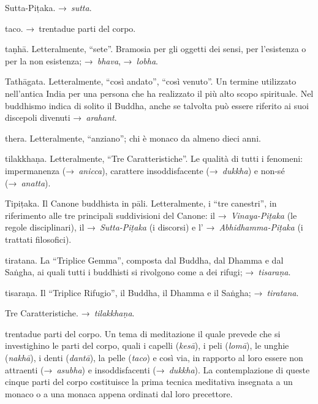 \begin{glossarydescription}
\item[Sutta-Piṭaka.] →~\emph{sutta}.


\item[taco.] →~trentadue parti del corpo.

\item[taṇhā.] Letteralmente, ``sete''. Bramosia per gli oggetti dei sensi,
  per l'esistenza o per la non esistenza; →~\emph{bhava}, →~\emph{lobha}.

\item[Tathāgata.] Letteralmente, ``così andato'', ``così venuto''. Un
  termine utilizzato nell'antica India per una persona che ha realizzato il più
  alto scopo spirituale. Nel buddhismo indica di solito il Buddha, anche se
  talvolta può essere riferito ai suoi discepoli divenuti →~\emph{arahant}.

\item[thera.] Letteralmente, ``anziano''; chi è monaco da almeno dieci
  anni.

\item[tilakkhaṇa.]\label{glossary-tilakkhana} Letteralmente, ``Tre Caratteristiche''. Le qualità di
  tutti i fenomeni: impermanenza (→~\emph{anicca}), carattere insoddisfacente
  (→~\emph{dukkha}) e non-sé (→~\emph{anatta}).

\item[Tipiṭaka.] Il Canone buddhista in pāli. Letteralmente, i ``tre
  canestri'', in riferimento alle tre principali suddivisioni del Canone: il
  →~\emph{Vinaya-Piṭaka} (le regole disciplinari), il →~\emph{Sutta-Piṭaka} (i
  discorsi) e l' →~\emph{Abhidhamma-Piṭaka} (i trattati filosofici).

\item[tiratana.] La ``Triplice Gemma'', composta dal Buddha, dal Dhamma e
  dal Saṅgha, ai quali tutti i buddhisti si rivolgono come a dei rifugi;
  →~\emph{tisaraṇa}.

\item[tisaraṇa.] Il ``Triplice Rifugio'', il Buddha, il Dhamma e il
  Saṅgha; →~\emph{tiratana}.

\item[Tre Caratteristiche.] →~\emph{tilakkhaṇa}.

\item[trentadue parti del corpo.] Un tema di meditazione il quale prevede che si
  investighino le parti del corpo, quali i capelli (\emph{kesā}), i peli
  (\emph{lomā}), le unghie (\emph{nakhā}), i denti (\emph{dantā}), la pelle
  (\emph{taco}) e così via, in rapporto al loro essere non attraenti
  (→~\emph{asubha}) e insoddisfacenti (→~\emph{dukkha}). La contemplazione di
  queste cinque parti del corpo costituisce la prima tecnica meditativa
  insegnata a un monaco o a una monaca appena ordinati dal loro precettore.


\end{glossarydescription}
